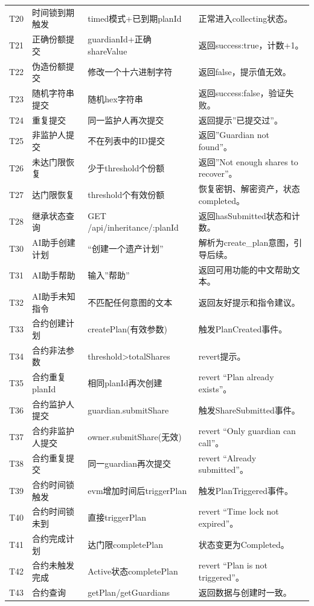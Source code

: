 \documentclass[UTF8,a4paper,zihao=-4,openany]{ctexrep}
\begin{document}
\begin{longtable}{p{1.3cm}p{3.2cm}p{4.2cm}p{5.5cm}}
T20 & 时间锁到期触发 & timed模式+已到期planId & 正常进入collecting状态。\\
T21 & 正确份额提交 & guardianId+正确shareValue & 返回success:true，计数+1。\\
T22 & 伪造份额提交 & 修改一个十六进制字符 & 返回false，提示值无效。\\
T23 & 随机字符串提交 & 随机hex字符串 & 返回success:false，验证失败。\\
T24 & 重复提交 & 同一监护人再次提交 & 返回提示”已提交过”。\\
T25 & 非监护人提交 & 不在列表中的ID提交 & 返回”Guardian not found”。\\
T26 & 未达门限恢复 & 少于threshold个份额 & 返回”Not enough shares to recover”。\\
T27 & 达门限恢复 & threshold个有效份额 & 恢复密钥、解密资产，状态completed。\\
T28 & 继承状态查询 & GET /api/inheritance/:planId & 返回hasSubmitted状态和计数。\\
T30 & AI助手创建计划 & “创建一个遗产计划” & 解析为create\_plan意图，引导后续。\\
T31 & AI助手帮助 & 输入”帮助” & 返回可用功能的中文帮助文本。\\
T32 & AI助手未知指令 & 不匹配任何意图的文本 & 返回友好提示和指令建议。\\
T33 & 合约创建计划 & createPlan(有效参数) & 触发PlanCreated事件。\\
T34 & 合约非法参数 & threshold>totalShares & revert提示。\\
T35 & 合约重复planId & 相同planId再次创建 & revert “Plan already exists”。\\
T36 & 合约监护人提交 & guardian.submitShare & 触发ShareSubmitted事件。\\
T37 & 合约非监护人提交 & owner.submitShare(无效) & revert “Only guardian can call”。\\
T38 & 合约重复提交 & 同一guardian再次提交 & revert “Already submitted”。\\
T39 & 合约时间锁触发 & evm增加时间后triggerPlan & 触发PlanTriggered事件。\\
T40 & 合约时间锁未到 & 直接triggerPlan & revert “Time lock not expired”。\\
T41 & 合约完成计划 & 达门限completePlan & 状态变更为Completed。\\
T42 & 合约未触发完成 & Active状态completePlan & revert “Plan is not triggered”。\\
T43 & 合约查询 & getPlan/getGuardians & 返回数据与创建时一致。\\
\bottomrule
\end{longtable}
\setlength{\extrarowheight}{0pt}
\end{document}
